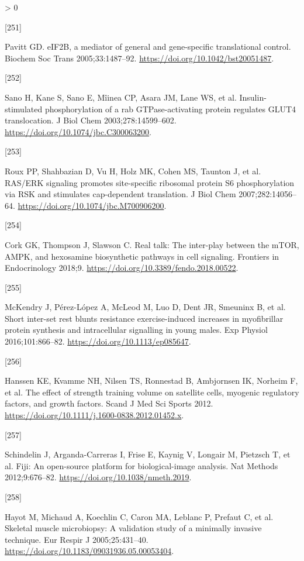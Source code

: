 \documentclass[twoside,10pt]{gihclass} %
\newlength{\cslhangindent}
\newlength{\csllabelwidth}
\newenvironment{CSLReferences}[3] %
 {%
  \setlength{\parindent}{0pt}
  \ifodd #1 \everypar{\setlength{\hangindent}{\cslhangindent}}\ignorespaces\fi
  \ifnum #2 > 0
  \setlength{\parskip}{#2\baselineskip}
  \fi
 }%
 {}
\newcommand{\CSLLeftMargin}[1]{\parbox[t]{\maxof{\widthof{#1}}{\csllabelwidth}}{#1}}
\newcommand{\CSLRightInline}[1]{\parbox[t]{\linewidth}{#1}}
\begin{document}
\begin{CSLReferences}{0}{0}
\leavevmode\hypertarget{ref-RN2853}{}%
\CSLLeftMargin{{[}251{]} }
\CSLRightInline{Pavitt GD. eIF2B, a mediator of general and gene-specific translational control. Biochem Soc Trans 2005;33:1487--92. \url{https://doi.org/10.1042/bst20051487}.}

\leavevmode\hypertarget{ref-RN2856}{}%
\CSLLeftMargin{{[}252{]} }
\CSLRightInline{Sano H, Kane S, Sano E, Mîinea CP, Asara JM, Lane WS, et al. Insulin-stimulated phosphorylation of a rab GTPase-activating protein regulates GLUT4 translocation. J Biol Chem 2003;278:14599--602. \url{https://doi.org/10.1074/jbc.C300063200}.}

\leavevmode\hypertarget{ref-RN2311}{}%
\CSLLeftMargin{{[}253{]} }
\CSLRightInline{Roux PP, Shahbazian D, Vu H, Holz MK, Cohen MS, Taunton J, et al. RAS/ERK signaling promotes site-specific ribosomal protein S6 phosphorylation via RSK and stimulates cap-dependent translation. J Biol Chem 2007;282:14056--64. \url{https://doi.org/10.1074/jbc.M700906200}.}

\leavevmode\hypertarget{ref-RN2858}{}%
\CSLLeftMargin{{[}254{]} }
\CSLRightInline{Cork GK, Thompson J, Slawson C. Real talk: The inter-play between the mTOR, AMPK, and hexosamine biosynthetic pathways in cell signaling. Frontiers in Endocrinology 2018;9. \url{https://doi.org/10.3389/fendo.2018.00522}.}

\leavevmode\hypertarget{ref-RN2857}{}%
\CSLLeftMargin{{[}255{]} }
\CSLRightInline{McKendry J, Pérez-López A, McLeod M, Luo D, Dent JR, Smeuninx B, et al. Short inter-set rest blunts resistance exercise-induced increases in myofibrillar protein synthesis and intracellular signalling in young males. Exp Physiol 2016;101:866--82. \url{https://doi.org/10.1113/ep085647}.}

\leavevmode\hypertarget{ref-RN796}{}%
\CSLLeftMargin{{[}256{]} }
\CSLRightInline{Hanssen KE, Kvamme NH, Nilsen TS, Ronnestad B, Ambjornsen IK, Norheim F, et al. The effect of strength training volume on satellite cells, myogenic regulatory factors, and growth factors. Scand J Med Sci Sports 2012. \url{https://doi.org/10.1111/j.1600-0838.2012.01452.x}.}

\leavevmode\hypertarget{ref-RN2561}{}%
\CSLLeftMargin{{[}257{]} }
\CSLRightInline{Schindelin J, Arganda-Carreras I, Frise E, Kaynig V, Longair M, Pietzsch T, et al. Fiji: An open-source platform for biological-image analysis. Nat Methods 2012;9:676--82. \url{https://doi.org/10.1038/nmeth.2019}.}

\leavevmode\hypertarget{ref-RN824}{}%
\CSLLeftMargin{{[}258{]} }
\CSLRightInline{Hayot M, Michaud A, Koechlin C, Caron MA, Leblanc P, Prefaut C, et al. Skeletal muscle microbiopsy: A validation study of a minimally invasive technique. Eur Respir J 2005;25:431--40. \url{https://doi.org/10.1183/09031936.05.00053404}.}


\end{CSLReferences}
\end{document}
